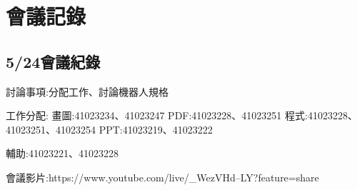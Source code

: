 \chapter{會議記錄}


\section{5/24會議紀錄}


討論事項:分配工作、討論機器人規格

工作分配:
畫圖:41023234、41023247
PDF:41023228、41023251
程式:41023228、41023251、41023254
PPT:41023219、41023222

輔助:41023221、41023228

會議影片:https://www.youtube.com/live/_WezVHd--LY?feature=share
